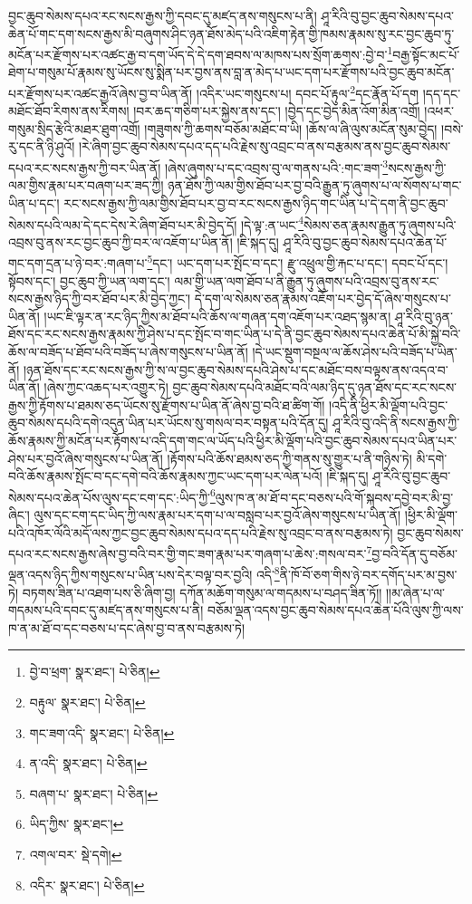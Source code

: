 བྱང་ཆུབ་སེམས་དཔའ་རང་སངས་རྒྱས་ཀྱི་དབང་དུ་མཛད་ནས་གསུངས་པ་ནི། ཤཱ་རིའི་བུ་བྱང་ཆུབ་སེམས་དཔའ་ཆེན་པོ་གང་དག་སངས་རྒྱས་མི་བཞུགས་ཤིང་ཉན་ཐོས་མེད་པའི་འཇིག་རྟེན་གྱི་ཁམས་རྣམས་སུ་རང་བྱང་ཆུབ་ཏུ་མངོན་པར་རྫོགས་པར་འཚང་རྒྱ་བ་དག་ཡོད་དེ་དེ་དག་ཐབས་ལ་མཁས་པས་སྲོག་ཆགས་:བྱེ་བ་\footnote{བྱེ་བ་ཕྲག་  སྣར་ཐང་།  པེ་ཅིན། }བརྒྱ་སྟོང་མང་པོ་ཐེག་པ་གསུམ་པོ་རྣམས་སུ་ཡོངས་སུ་སྨིན་པར་བྱས་ནས་བླ་ན་མེད་པ་ཡང་དག་པར་རྫོགས་པའི་བྱང་ཆུབ་མངོན་པར་རྫོགས་པར་འཚང་རྒྱའོ་ཞེས་བྱ་བ་ཡིན་ནོ། །འདིར་ཡང་གསུངས་པ། དབང་པོ་རྟུལ་\footnote{བརྟུལ་  སྣར་ཐང་།  པེ་ཅིན། }དང་རྣོན་པོ་དག །དད་དང་མཐོང་ཐོབ་རིགས་ནས་རིགས། །བར་ཆད་གཅིག་པར་སྐྱེས་ནས་དང་། །བྱེད་དང་བྱེད་མིན་འོག་མིན་འགྲོ། །འཕར་གསུམ་སྲིད་རྩེའི་མཐར་ཐུག་འགྲོ། །གཟུགས་ཀྱི་ཆགས་བཅོམ་མཐོང་བ་ཡི། །ཆོས་ལ་ཞི་ལུས་མངོན་སུམ་བྱེད། །བསེ་རུ་དང་ནི་ཉི་ཤུའོ། །རེ་ཞིག་བྱང་ཆུབ་སེམས་དཔའ་དད་པའི་རྗེས་སུ་འབྲང་བ་ནས་བརྩམས་ནས་བྱང་ཆུབ་སེམས་དཔའ་རང་སངས་རྒྱས་ཀྱི་བར་ཡིན་ནོ། །ཞེས་ཞུགས་པ་དང་འབྲས་བུ་ལ་གནས་པའི་:གང་ཟག་\footnote{གང་ཟག་འདི་  སྣར་ཐང་།  པེ་ཅིན། }སངས་རྒྱས་ཀྱི་ལམ་གྱིས་རྣམ་པར་བཞག་པར་ཟད་ཀྱི། ཉན་ཐོས་ཀྱི་ལམ་གྱིས་ཐོབ་པར་བྱ་བའི་རྒྱུན་ཏུ་ཞུགས་པ་ལ་སོགས་པ་གང་ཡིན་པ་དང་། རང་སངས་རྒྱས་ཀྱི་ལམ་གྱིས་ཐོབ་པར་བྱ་བ་རང་སངས་རྒྱས་ཉིད་གང་ཡིན་པ་དེ་དག་ནི་བྱང་ཆུབ་སེམས་དཔའི་ལམ་དེ་དང་དེས་རེ་ཞིག་ཐོབ་པར་མི་བྱེད་དོ། །དེ་ལྟ་:ན་ཡང་\footnote{ན་འདི་  སྣར་ཐང་།  པེ་ཅིན། }སེམས་ཅན་རྣམས་རྒྱུན་ཏུ་ཞུགས་པའི་འབྲས་བུ་ནས་རང་བྱང་ཆུབ་ཀྱི་བར་ལ་འཇོག་པ་ཡིན་ནོ། །ཇི་སྐད་དུ། ཤཱ་རིའི་བུ་བྱང་ཆུབ་སེམས་དཔའ་ཆེན་པོ་གང་དག་དྲན་པ་ཉེ་བར་:གཞག་པ་\footnote{བཞག་པ་  སྣར་ཐང་།  པེ་ཅིན། }དང་། ཡང་དག་པར་སྤོང་བ་དང་། རྫུ་འཕྲུལ་གྱི་རྐང་པ་དང་། དབང་པོ་དང་། སྟོབས་དང་། བྱང་ཆུབ་ཀྱི་ཡན་ལག་དང་། ལམ་གྱི་ཡན་ལག་ཐོབ་པ་ནི་རྒྱུན་ཏུ་ཞུགས་པའི་འབྲས་བུ་ནས་རང་སངས་རྒྱས་ཉིད་ཀྱི་བར་ཐོབ་པར་མི་བྱེད་ཀྱང་། དེ་དག་ལ་སེམས་ཅན་རྣམས་འཇོག་པར་བྱེད་དོ་ཞེས་གསུངས་པ་ཡིན་ནོ། །ཡང་ཇི་ལྟར་ན་རང་ཉིད་ཀྱིས་མ་ཐོབ་པའི་ཆོས་ལ་གཞན་དག་འཇོག་པར་འཐད་སྙམ་ན། ཤཱ་རིའི་བུ་ཉན་ཐོས་དང་རང་སངས་རྒྱས་རྣམས་ཀྱི་ཤེས་པ་དང་སྤོང་བ་གང་ཡིན་པ་དེ་ནི་བྱང་ཆུབ་སེམས་དཔའ་ཆེན་པོ་མི་སྐྱེ་བའི་ཆོས་ལ་བཟོད་པ་ཐོབ་པའི་བཟོད་པ་ཞེས་གསུངས་པ་ཡིན་ནོ། །དེ་ཡང་སྡུག་བསྔལ་ལ་ཆོས་ཤེས་པའི་བཟོད་པ་ཡིན་ནོ། །ཉན་ཐོས་དང་རང་སངས་རྒྱས་ཀྱི་ས་ལ་བྱང་ཆུབ་སེམས་དཔའི་ཤེས་པ་དང་མཐོང་བས་བལྟས་ནས་འདའ་བ་ཡིན་ནོ། །ཞེས་ཀྱང་འཆད་པར་འགྱུར་ཏེ། བྱང་ཆུབ་སེམས་དཔའི་མཐོང་བའི་ལམ་ཉིད་དུ་ཉན་ཐོས་དང་རང་སངས་རྒྱས་ཀྱི་རྟོགས་པ་ཐམས་ཅད་ཡོངས་སུ་རྫོགས་པ་ཡིན་ནོ་ཞེས་བྱ་བའི་ཐ་ཚིག་གོ། །འདི་ནི་ཕྱིར་མི་ལྡོག་པའི་བྱང་ཆུབ་སེམས་དཔའི་དགེ་འདུན་ཡིན་པར་ཡོངས་སུ་གསལ་བར་བསྟན་པའི་དོན་དུ། ཤཱ་རིའི་བུ་འདི་ནི་སངས་རྒྱས་ཀྱི་ཆོས་རྣམས་ཀྱི་མངོན་པར་རྟོགས་པ་འདི་དག་གང་ལ་ཡོད་པའི་ཕྱིར་མི་ལྡོག་པའི་བྱང་ཆུབ་སེམས་དཔའ་ཡིན་པར་ཤེས་པར་བྱའོ་ཞེས་གསུངས་པ་ཡིན་ནོ། །རྟོགས་པའི་ཆོས་ཐམས་ཅད་ཀྱི་གནས་སུ་གྱུར་པ་ནི་གཉིས་ཏེ། མི་དགེ་བའི་ཆོས་རྣམས་སྤོང་བ་དང་དགེ་བའི་ཆོས་རྣམས་ཀྱང་ཡང་དག་པར་ལེན་པའོ། །ཇི་སྐད་དུ། ཤཱ་རིའི་བུ་བྱང་ཆུབ་སེམས་དཔའ་ཆེན་པོས་ལུས་དང་ངག་དང་:ཡིད་ཀྱི་\footnote{ཡིད་ཀྱིས་  སྣར་ཐང་། }ལུས་ཁ་ན་མ་ཐོ་བ་དང་བཅས་པའི་གོ་སྐབས་དབྱེ་བར་མི་བྱ་ཞིང་། ལུས་དང་ངག་དང་ཡིད་ཀྱི་ལས་རྣམ་པར་དག་པ་ལ་བསླབ་པར་བྱའོ་ཞེས་གསུངས་པ་ཡིན་ནོ། །ཕྱིར་མི་ལྡོག་པའི་འཁོར་ལོའི་མདོ་ལས་ཀྱང་བྱང་ཆུབ་སེམས་དཔའ་དད་པའི་རྗེས་སུ་འབྲང་བ་ནས་བརྩམས་ཏེ། བྱང་ཆུབ་སེམས་དཔའ་རང་སངས་རྒྱས་ཞེས་བྱ་བའི་བར་གྱི་གང་ཟག་རྣམ་པར་གཞག་པ་ཆེས་:གསལ་བར་\footnote{འགལ་བར་  སྡེ་དགེ། }བྱ་བའི་དོན་དུ་བཅོམ་ལྡན་འདས་ཉིད་ཀྱིས་གསུངས་པ་ཡིན་པས་དེར་བལྟ་བར་བྱའི། འདི་\footnote{འདིར་  སྣར་ཐང་།  པེ་ཅིན། }ནི་ཁོ་བོ་ཅག་གིས་ཉེ་བར་དགོད་པར་མ་བྱས་ཏེ། བཏགས་ཟིན་པ་འཐག་པས་ཅི་ཞིག་བྱ། དཀོན་མཆོག་གསུམ་ལ་གདམས་པ་བཤད་ཟིན་ཏོ།། །།མ་ཞེན་པ་ལ་གདམས་པའི་དབང་དུ་མཛད་ནས་གསུངས་པ་ནི། བཅོམ་ལྡན་འདས་བྱང་ཆུབ་སེམས་དཔའ་ཆེན་པོའི་ལུས་ཀྱི་ལས་ཁ་ན་མ་ཐོ་བ་དང་བཅས་པ་དང་ཞེས་བྱ་བ་ནས་བརྩམས་ཏེ། 